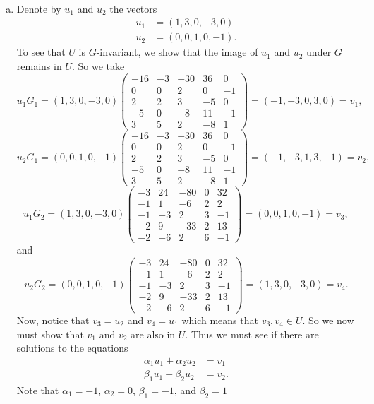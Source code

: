 \documentclass[leqno]{article}
\begin{document}
\begin{solution}~
\begin{enumerate}[(a)]
    \item Denote by $u_1$ and $u_2$ the vectors
    \begin{align*}
    u_1 &= (1,3,0,-3,0)\\
    u_2 &= (0,0,1,0,-1).
    \end{align*}
    To see that $U$ is $G$-invariant, we show that the image of $u_1$ and $u_2$ under $G$ remains in $U$.  So we take
    \[
    u_1G_1 = (1,3,0,-3,0) \begin{pmatrix}
-16 & -3 & -30 & 36 & 0\\
0 & 0 & 2 & 0 & -1\\
2 & 2 & 3 & -5 & 0\\
-5 & 0 & -8 & 11 & -1\\
3 & 5 & 2 & -8 & 1
\end{pmatrix} = (-1,-3,0,3,0) = v_1,
    \]
    \[
    u_2G_1 = (0,0,1,0,-1)  \begin{pmatrix}
-16 & -3 & -30 & 36 & 0\\
0 & 0 & 2 & 0 & -1\\
2 & 2 & 3 & -5 & 0\\
-5 & 0 & -8 & 11 & -1\\
3 & 5 & 2 & -8 & 1
\end{pmatrix} = (-1,-3,1,3,-1) = v_2,
    \]
    \[
    u_1 G_2 = (1,3,0,-3,0) \begin{pmatrix}
-3 & 24 & -80 & 0 & 32\\
-1 & 1 & -6  & 2 & 2\\
-1 & -3 & 2 & 3 & -1\\
-2 & 9 & -33 & 2 & 13\\
-2 & -6 & 2 & 6 & -1
\end{pmatrix} = (0,0,1,0,-1)=v_3,
    \]
    and
    \[
    u_2 G_2 = (0,0,1,0,-1) \begin{pmatrix}
-3 & 24 & -80 & 0 & 32\\
-1 & 1 & -6  & 2 & 2\\
-1 & -3 & 2 & 3 & -1\\
-2 & 9 & -33 & 2 & 13\\
-2 & -6 & 2 & 6 & -1
\end{pmatrix} = (1,3,0,-3,0) = v_4.
    \]
    Now, notice that $v_3=u_2$ and $v_4=u_1$ which means that $v_3,v_4\in U$.  So we now must show that $v_1$ and $v_2$ are also in $U$. Thus we must see if there are solutions to the equations
    \begin{align*}
        \alpha_1 u_1 + \alpha_2 u_2 &= v_1\\
        \beta_1 u_1 + \beta_2 u_2 &= v_2.
    \end{align*}
    Note that $\alpha_1=-1$, $\alpha_2=0$, $\beta_1=-1$, and $\beta_2=1$
    

\end{enumerate}
\end{solution}
\end{document}
